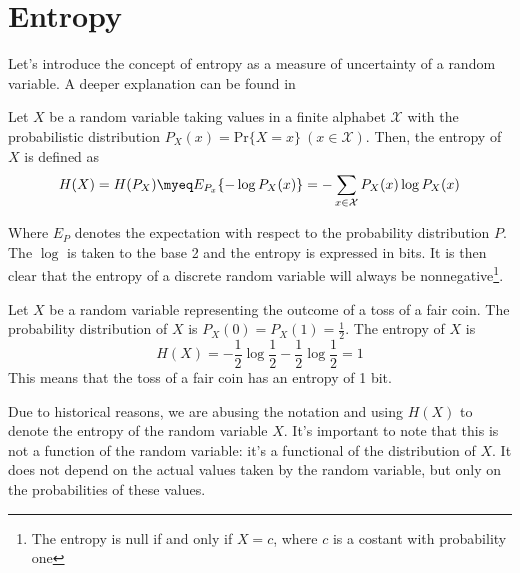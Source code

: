 \section{Entropy} \label{sec:shannon_entropy}

Let's introduce the concept of entropy as a measure of uncertainty of a random variable. A deeper explanation can be found in \cite{han2002mathematics,navarro2016compact,ElementsofInformationTheory}

\begin{definition}\label{def:entropy}
    Let $X$ be a random variable taking values in a finite alphabet $\mathcal{X}$ with the probabilistic distribution $P_X(x)= \text{Pr}\{X=x\}~(x\in\mathcal{X})$. Then, the entropy of $X$ is defined as
    \begin{equation}
        H(X) = H(P_X) \myeq E_{P_x} \{-\log P_X(x)\} = -\sum_{x\in\mathcal{X}} P_X(x)\log P_X(x)
    \end{equation}
\end{definition}
\noindent Where $E_P$ denotes the expectation with respect to the probability distribution $P$. The $\log$ is taken to the base 2 and the entropy is expressed in bits. It is then clear that the entropy of a discrete random variable will always be nonnegative\footnote{The entropy is null if and only if $X = c$, where $c$ is a costant with probability one}. \\



\begin{example}
    Let $X$ be a random variable representing the outcome of a toss of a fair coin. The probability distribution of $X$ is $P_X(0) = P_X(1) = \frac{1}{2}$. The entropy of $X$ is
    \begin{equation}
        H(X) = -\frac{1}{2}\log\frac{1}{2} - \frac{1}{2}\log\frac{1}{2} = 1
    \end{equation}
    This means that the toss of a fair coin has an entropy of 1 bit.
\end{example}

\begin{remark}
    Due to historical reasons, we are abusing the notation and using $H(X)$ to denote the entropy of the random variable $X$. It's important to note that this is not a function of the random variable: it's a functional of the distribution of $X$. It does not depend on the actual values taken by the random variable, but only on the probabilities of these values.
\end{remark}

